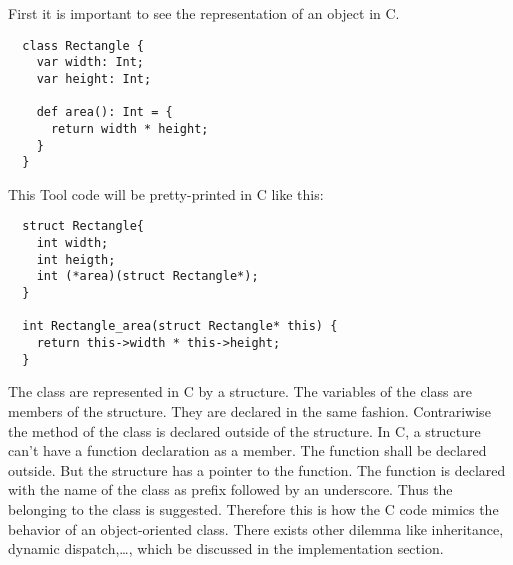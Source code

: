 First it is important to see the representation of an object in C.
\begin{lstlisting}
  class Rectangle {
    var width: Int;
    var height: Int;

    def area(): Int = {
      return width * height;
    }
  }
\end{lstlisting}
This Tool code will be pretty-printed in C like this:
\begin{lstlisting}
  struct Rectangle{
    int width;
    int heigth;
    int (*area)(struct Rectangle*);
  }

  int Rectangle_area(struct Rectangle* this) {
    return this->width * this->height;
  }
\end{lstlisting}
The class are represented in C by a structure. The variables of the class
are members of the structure. They are declared in the same fashion.
\newline
Contrariwise the method of the class is declared outside of the structure.
In C, a structure can't have a function declaration as a member. The function shall
be declared outside. But the structure has a pointer to the function.
\newline
The function is declared with the name of the class as prefix followed by an underscore.
Thus the belonging to the  class is suggested.
\newline
Therefore this is how the C code mimics the behavior of an object-oriented class.
\newline
There exists other dilemma like inheritance, dynamic dispatch,\ldots, which be discussed
in the implementation section. 
\newline
